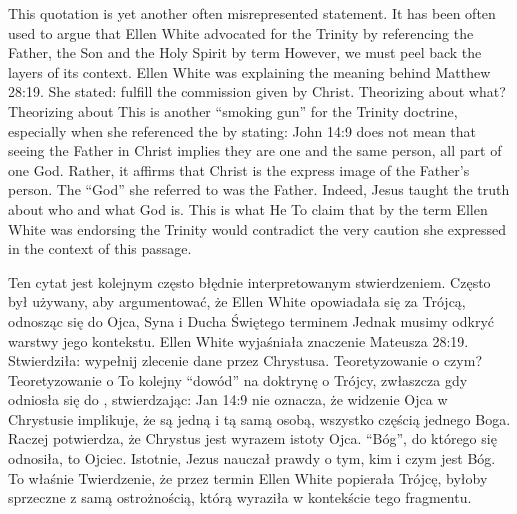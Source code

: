 This quotation is yet another often misrepresented statement. It has been often used to argue that Ellen White advocated for the Trinity by referencing the Father, the Son and the Holy Spirit by term  However, we must peel back the layers of its context. Ellen White was explaining the meaning behind Matthew 28:19. She stated:  fulfill the commission given by Christ. Theorizing about what? Theorizing about  This is another “smoking gun” for the Trinity doctrine, especially when she referenced the  by stating:  John 14:9 does not mean that seeing the Father in Christ implies they are one and the same person, all part of one God. Rather, it affirms that Christ is the express image of the Father’s person. The “God” she referred to was the Father. Indeed, Jesus taught the truth about who and what God is. This is what He   To claim that by the term  Ellen White was endorsing the Trinity would contradict the very caution she expressed in the context of this passage.


Ten cytat jest kolejnym często błędnie interpretowanym stwierdzeniem. Często był używany, aby argumentować, że Ellen White opowiadała się za Trójcą, odnosząc się do Ojca, Syna i Ducha Świętego terminem  Jednak musimy odkryć warstwy jego kontekstu. Ellen White wyjaśniała znaczenie Mateusza 28:19. Stwierdziła:  wypełnij zlecenie dane przez Chrystusa. Teoretyzowanie o czym? Teoretyzowanie o  To kolejny “dowód” na doktrynę o Trójcy, zwłaszcza gdy odniosła się do , stwierdzając:  Jan 14:9 nie oznacza, że widzenie Ojca w Chrystusie implikuje, że są jedną i tą samą osobą, wszystko częścią jednego Boga. Raczej potwierdza, że Chrystus jest wyrazem istoty Ojca. “Bóg”, do którego się odnosiła, to Ojciec. Istotnie, Jezus nauczał prawdy o tym, kim i czym jest Bóg. To właśnie   Twierdzenie, że przez termin  Ellen White popierała Trójcę, byłoby sprzeczne z samą ostrożnością, którą wyraziła w kontekście tego fragmentu.


